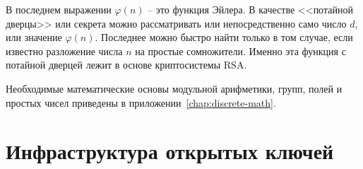 В последнем выражении $\varphi \left( n \right)$ -- это функция Эйлера. В качестве <<потайной дверцы>> или секрета можно рассматривать или непосредственно само число $d$, или значение $\varphi \left( n \right)$. Последнее можно быстро найти только в том случае, если известно разложение числа $n$ на простые сомножители. Именно эта функция с потайной дверцей лежит в основе криптосистемы RSA.

Необходимые математические основы модульной арифметики, групп, полей и простых чисел приведены в приложении~\ref{chap:discrete-math}.









\section{Инфраструктура открытых ключей}\label{chapter-public-key-infrastructure}




